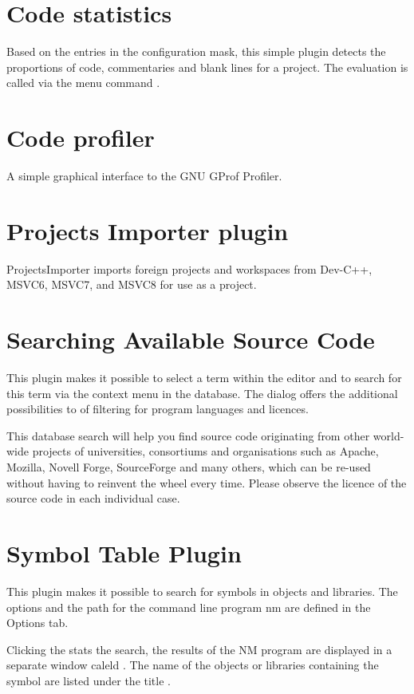 \section{Code statistics}


Based on the entries in the configuration mask, this simple plugin detects the proportions of code, commentaries and blank lines for a project. The evaluation is called via the menu command .


\section{Code profiler}

A simple graphical interface to the GNU GProf Profiler.


\section{Projects Importer plugin}

ProjectsImporter imports foreign projects and workspaces from Dev-C++, MSVC6, MSVC7, and MSVC8 for use as a \codeblocks project. 


\section{Searching Available Source Code}

This plugin makes it possible to select a term within the editor and to search for this term via the context menu  in the \cite{url:koders} database. The dialog offers the additional possibilities to of filtering for program languages and licences.


This database search will help you find source code originating from other world-wide projects of universities, consortiums and organisations such as Apache, Mozilla, Novell Forge, SourceForge and many others, which can be re-used without having to reinvent the wheel every time. Please observe the licence of the source code in each individual case.


\section{Symbol Table Plugin}

This plugin makes it possible to search for symbols in objects and libraries. The options and the path for the command line program nm are defined in the Options tab.


Clicking the  stats the search, the results of the NM program are displayed in a separate window caleld . The name of the objects or libraries containing the symbol are listed under the title .

